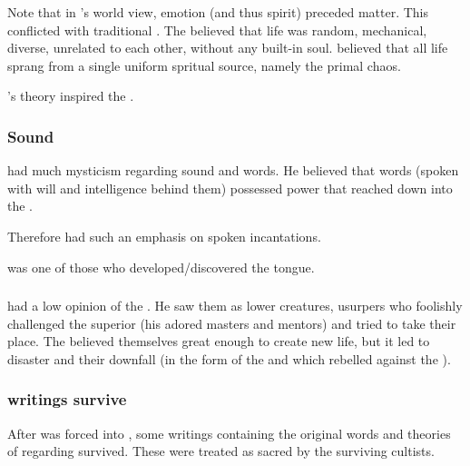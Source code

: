 Note that in \Sethicus's world view, emotion (and thus spirit) preceded matter. 
This conflicted with traditional . 
The \ophidians believed that life was random, mechanical, diverse, unrelated to each other, without any built-in soul. 
\Sethicus believed that all life sprang from a single uniform spritual source, namely the primal chaos. 

\Sethicus's theory inspired the .






\subsubsection{Sound}
\Sethicus had much mysticism regarding sound and words. 
He believed that words (spoken with will and intelligence behind them) possessed power that reached down into the . 

Therefore  had such an emphasis on spoken incantations.

\Sethicus was one of those who developed/discovered the  tongue. 






\subsubsection{\Voyagers}
\Sethicus had a low opinion of the \voyagers.
He saw them as lower creatures, usurpers who foolishly challenged the superior \xss (his adored masters and mentors) and tried to take their place.
The \voyagers believed themselves great enough to create new life, but it led to disaster and their downfall (in the form of the  and  which rebelled against the \voyagers). 




\subsubsection{\Sethican writings survive}
After \Sethicus was forced into , some writings containing the original words and theories of \Sethicus regarding  survived. 
These were treated as sacred by the surviving \Sethican cultists. 

